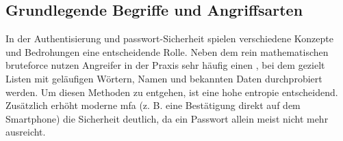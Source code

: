 \documentclass[12pt,a4paper]{article}
\begin{document}
\subsection{Grundlegende Begriffe und Angriffsarten}
In der Authentisierung und \gls{passwort}-Sicherheit spielen verschiedene Konzepte und Bedrohungen eine entscheidende Rolle. Neben dem rein mathematischen \gls{bruteforce} nutzen Angreifer in der Praxis sehr häufig einen , bei dem gezielt Listen mit geläufigen Wörtern, Namen und bekannten Daten \mbox{durchprobiert} werden. Um diesen \mbox{Methoden} zu entgehen, ist eine hohe \gls{entropie} entscheidend. \\ Zusätzlich erhöht moderne \gls{mfa} (z. B. eine Bestätigung direkt auf dem Smartphone) die Sicherheit deutlich, da ein Passwort allein meist nicht mehr ausreicht.
\end{document}
